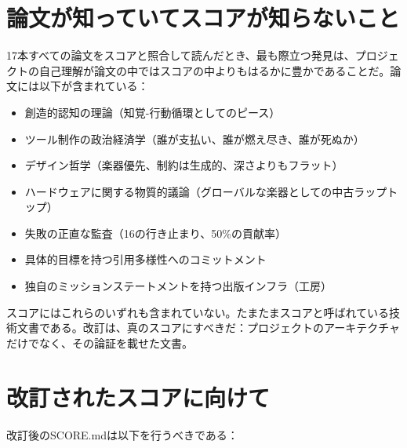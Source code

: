 \documentclass[10pt,letterpaper,twocolumn]{article}
\begin{document}
\section{論文が知っていてスコアが知らないこと}

17本すべての論文をスコアと照合して読んだとき、最も際立つ発見は、プロジェクトの自己理解が論文の中ではスコアの中よりもはるかに豊かであることだ。論文には以下が含まれている：

\begin{itemize}
\item 創造的認知の理論（知覚-行動循環としてのピース）
\item ツール制作の政治経済学（誰が支払い、誰が燃え尽き、誰が死ぬか）
\item デザイン哲学（楽器優先、制約は生成的、深さよりもフラット）
\item ハードウェアに関する物質的議論（グローバルな楽器としての中古ラップトップ）
\item 失敗の正直な監査（16の行き止まり、50\%の貢献率）
\item 具体的目標を持つ引用多様性へのコミットメント
\item 独自のミッションステートメントを持つ出版インフラ（工房）
\end{itemize}

スコアにはこれらのいずれも含まれていない。たまたまスコアと呼ばれている技術文書である。改訂は、真のスコアにすべきだ：プロジェクトのアーキテクチャだけでなく、その論証を載せた文書。

\section{改訂されたスコアに向けて}

改訂後のSCORE.mdは以下を行うべきである：
\end{document}
